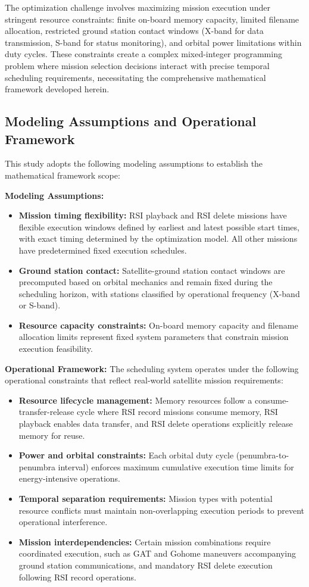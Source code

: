 \documentclass[preprint,3p,12pt,authoryear]{elsarticle}
\begin{document}
The optimization challenge involves maximizing mission execution under stringent resource constraints: finite on-board memory capacity, limited filename allocation, restricted ground station contact windows (X-band for data transmission, S-band for status monitoring), and orbital power limitations within duty cycles. These constraints create a complex mixed-integer programming problem where mission selection decisions interact with precise temporal scheduling requirements, necessitating the comprehensive mathematical framework developed herein.


\subsection{Modeling Assumptions and Operational Framework}

This study adopts the following modeling assumptions to establish the mathematical framework scope:

\textbf{Modeling Assumptions:}
\begin{itemize}
    \item \textbf{Mission timing flexibility:} RSI playback and RSI delete missions have flexible execution windows defined by earliest and latest possible start times, with exact timing determined by the optimization model. All other missions have predetermined fixed execution schedules.
    \item \textbf{Ground station contact:} Satellite-ground station contact windows are precomputed based on orbital mechanics and remain fixed during the scheduling horizon, with stations classified by operational frequency (X-band or S-band).
    \item \textbf{Resource capacity constraints:} On-board memory capacity and filename allocation limits represent fixed system parameters that constrain mission execution feasibility.
\end{itemize}

\textbf{Operational Framework:}
The scheduling system operates under the following operational constraints that reflect real-world satellite mission requirements:
\begin{itemize}
    \item \textbf{Resource lifecycle management:} Memory resources follow a consume-transfer-release cycle where RSI record missions consume memory, RSI playback enables data transfer, and RSI delete operations explicitly release memory for reuse.
    \item \textbf{Power and orbital constraints:} Each orbital duty cycle (penumbra-to-penumbra interval) enforces maximum cumulative execution time limits for energy-intensive operations.
    \item \textbf{Temporal separation requirements:} Mission types with potential resource conflicts must maintain non-overlapping execution periods to prevent operational interference.
    \item \textbf{Mission interdependencies:} Certain mission combinations require coordinated execution, such as GAT and Gohome maneuvers accompanying ground station communications, and mandatory RSI delete execution following RSI record operations.
\end{itemize}
\end{document}

